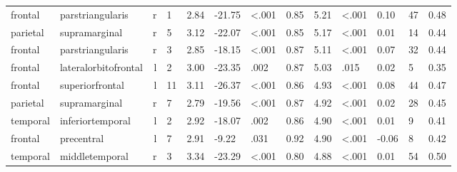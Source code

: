 \documentclass{article}
\begin{document}
\begin{longtable}{llrR{1.3cm}R{1cm}R{1.3cm}R{1cm}R{1cm}R{1.3cm}R{1cm}R{1.8cm}R{1.3cm}R{1.8cm}}
   frontal &          parstriangularis &    r &         1 &                  2.84 &           -21.75 &      \textless.001 &                               0.85 &                          5.21 &                   \textless.001 &   0.10 &     47 &      0.48 \\
  parietal &             supramarginal &    r &         5 &                  3.12 &           -22.07 &      \textless.001 &                               0.85 &                          5.17 &                   \textless.001 &   0.01 &     14 &      0.44 \\
   frontal &          parstriangularis &    r &         3 &                  2.85 &           -18.15 &      \textless.001 &                               0.87 &                          5.11 &                   \textless.001 &   0.07 &     32 &      0.44 \\
   frontal &      lateralorbitofrontal &    l &         2 &                  3.00 &           -23.35 &               .002 &                               0.87 &                          5.03 &                            .015 &   0.02 &      5 &      0.35 \\
   frontal &           superiorfrontal &    l &        11 &                  3.11 &           -26.37 &      \textless.001 &                               0.86 &                          4.93 &                   \textless.001 &   0.08 &     44 &      0.47 \\
  parietal &             supramarginal &    r &         7 &                  2.79 &           -19.56 &      \textless.001 &                               0.87 &                          4.92 &                   \textless.001 &   0.02 &     28 &      0.45 \\
  temporal &          inferiortemporal &    l &         2 &                  2.92 &           -18.07 &               .002 &                               0.86 &                          4.90 &                   \textless.001 &   0.01 &      9 &      0.41 \\
   frontal &                precentral &    l &         7 &                  2.91 &            -9.22 &               .031 &                               0.92 &                          4.90 &                   \textless.001 &  -0.06 &      8 &      0.42 \\
  temporal &            middletemporal &    r &         3 &                  3.34 &           -23.29 &      \textless.001 &                               0.80 &                          4.88 &                   \textless.001 &   0.01 &     54 &      0.50 \\

\end{longtable}
\end{document}
